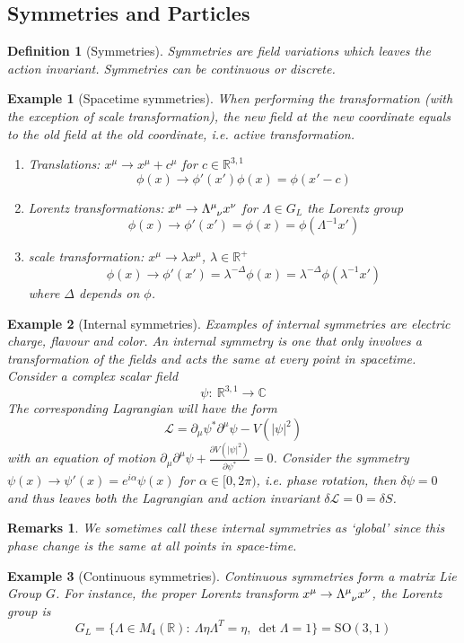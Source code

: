 \documentclass[a4paper]{article}
\newtheorem{remarks}{Remarks}[section]
\newtheorem{eg}{Example}[section]
\theoremstyle{new}
\newtheorem{defi}{Definition}[section]
\begin{document}
\subsection{Symmetries and Particles}
\begin{defi}[Symmetries]
Symmetries are field variations which leaves the action invariant. Symmetries can be continuous or discrete.
\end{defi}
\begin{eg}[Spacetime symmetries]
When performing the transformation (with the exception of scale transformation), the new field at the new coordinate equals to the old field at the old coordinate, i.e. active transformation.
\begin{enumerate}
    \item Translations: $x^\mu\rightarrow x^\mu+c^\mu$ for $c\in\mathbb{R}^{3,1}$
    $$\phi(x)\rightarrow\phi'(x')\phi(x)=\phi(x'-c)$$
    \item Lorentz transformations: $x^\mu\rightarrow\tensor*{\Lambda}{*_{}^{\mu}_{\nu}}x^\nu$ for $\Lambda\in G_L$ the Lorentz group
    $$\phi(x)\rightarrow\phi'(x')=\phi(x)=\phi(\Lambda^{-1}x')$$
    \item scale transformation: $x^\mu\rightarrow\lambda x^\mu$, $\lambda\in\mathbb{R}^+$
    $$\phi(x)\rightarrow\phi'(x')=\lambda^{-\Delta}\phi(x)=\lambda^{-\Delta}\phi(\lambda^{-1}x')$$
    where $\Delta$ depends on $\phi$.
\end{enumerate}
\end{eg}
\begin{eg}[Internal symmetries]
Examples of internal symmetries are electric charge, flavour and color. An internal symmetry is one that only involves a transformation of the fields and acts the same at every point in spacetime. Consider a complex scalar field
$$\psi:~\mathbb{R}^{3,1}\rightarrow\mathbb{C}$$
The corresponding Lagrangian will have the form
$$\mathcal{L}=\partial_\mu\psi^*\partial^\mu\psi-V(|\psi|^2)$$
with an equation of motion $\partial_\mu\partial^\mu\psi+\frac{\partial V(|\psi|^2)}{\partial\psi^*}=0$. Consider the symmetry $\psi(x)\rightarrow\psi'(x)=e^{i\alpha}\psi(x)$ for $\alpha\in[0,2\pi)$, i.e. phase rotation, then $\delta\psi=0$ and thus leaves both the Lagrangian and action invariant $\delta\mathcal{L}=0=\delta S$.
\end{eg}
\begin{remarks}
We sometimes call these internal symmetries as `global’ since this phase change is the same at all points in space-time.
\end{remarks}
\begin{eg}[Continuous symmetries]
Continuous symmetries form a matrix Lie Group $G$. For instance, the proper Lorentz transform $x^\mu\rightarrow\tensor*{\Lambda}{*_{}^{\mu}_{\nu}}x^\nu$, the Lorentz group is
$$G_L=\{\Lambda\in M_4(\mathbb{R}):~\Lambda\eta\Lambda^T=\eta,~\det\Lambda=1\}=\text{SO}(3,1)$$
\end{eg}
\end{document}
